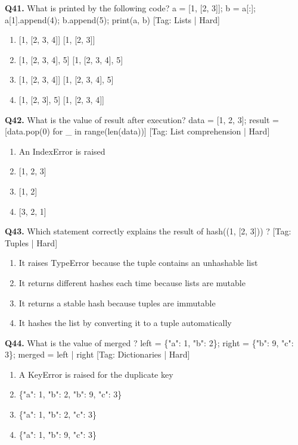 \vspace{2mm}
\noindent\textbf{Q41.} What is printed by the following code? a = [1, [2, 3]]; b = a[:]; a[1].append(4); b.append(5); print(a, b) \hfill [Tag: Lists | Hard]
\begin{enumerate}[label=(\alph*),topsep=2pt,itemsep=1pt,partopsep=0pt,parsep=0pt]
    \item {[1, [2, 3, 4]] [1, [2, 3]]}
    \item {[1, [2, 3, 4], 5] [1, [2, 3, 4], 5]}
    \item {[1, [2, 3, 4]] [1, [2, 3, 4], 5]}
    \item {[1, [2, 3], 5] [1, [2, 3, 4]]}
\end{enumerate}
\vspace{2mm}
\noindent\textbf{Q42.} What is the value of result after execution? data = [1, 2, 3]; result = [data.pop(0) for \_ in range(len(data))] \hfill [Tag: List comprehension | Hard]
\begin{enumerate}[label=(\alph*),topsep=2pt,itemsep=1pt,partopsep=0pt,parsep=0pt]
    \item {An IndexError is raised}
    \item {[1, 2, 3]}
    \item {[1, 2]}
    \item {[3, 2, 1]}
\end{enumerate}
\vspace{2mm}
\noindent\textbf{Q43.} Which statement correctly explains the result of hash((1, [2, 3])) ? \hfill [Tag: Tuples | Hard]
\begin{enumerate}[label=(\alph*),topsep=2pt,itemsep=1pt,partopsep=0pt,parsep=0pt]
    \item {It raises TypeError because the tuple contains an unhashable list}
    \item {It returns different hashes each time because lists are mutable}
    \item {It returns a stable hash because tuples are immutable}
    \item {It hashes the list by converting it to a tuple automatically}
\end{enumerate}
\vspace{2mm}
\noindent\textbf{Q44.} What is the value of merged ? left = \{"a": 1, "b": 2\}; right = \{"b": 9, "c": 3\}; merged = left | right \hfill [Tag: Dictionaries | Hard]
\begin{enumerate}[label=(\alph*),topsep=2pt,itemsep=1pt,partopsep=0pt,parsep=0pt]
    \item {A KeyError is raised for the duplicate key}
    \item {\{"a": 1, "b": 2, "b": 9, "c": 3\}}
    \item {\{"a": 1, "b": 2, "c": 3\}}
    \item {\{"a": 1, "b": 9, "c": 3\}}
\end{enumerate}
